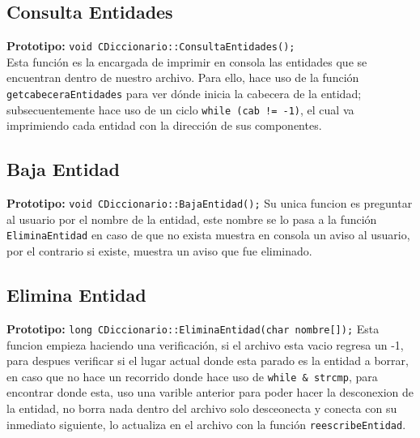 \documentclass[12pt]{article}
\begin{document}
{}
\subsection*{Consulta Entidades}
\textbf{Prototipo:} \verb|void CDiccionario::ConsultaEntidades();| \\
Esta función es la encargada de imprimir en consola las entidades que
se encuentran dentro de nuestro archivo. Para ello, hace uso de la función
\verb|getcabeceraEntidades| para ver dónde inicia la cabecera de la entidad;
subsecuentemente hace uso de un ciclo \verb|while (cab != -1)|, el cual va
imprimiendo cada entidad con la dirección de sus componentes.

{}
\subsection*{Baja Entidad}
\textbf{Prototipo:} \verb|void CDiccionario::BajaEntidad();|
Su unica funcion es preguntar al usuario por el nombre de la
entidad, este nombre se lo pasa a la función \verb|EliminaEntidad|
en caso de que no exista muestra en consola un aviso al usuario,
por el contrario si existe, muestra un aviso que fue eliminado.

{}
\subsection*{Elimina Entidad}
\textbf{Prototipo:} \verb|long CDiccionario::EliminaEntidad(char nombre[]);|
Esta funcion empieza haciendo una verificación, si el archivo esta vacio
regresa un -1, para despues verificar si el lugar actual donde esta parado es
la entidad a borrar, en caso que no hace un recorrido donde hace uso de
\verb|while & strcmp|, para encontrar donde esta, uso una varible anterior
para poder hacer la desconexion de la entidad, no borra nada dentro del archivo
solo desceonecta y conecta con su inmediato siguiente, lo actualiza en el archivo
con la función \verb|reescribeEntidad|.

\end{document}
